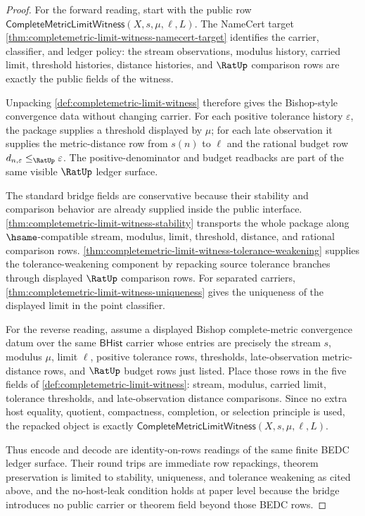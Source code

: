 \begin{proof}
For the forward reading, start with the public row
$\mathsf{CompleteMetricLimitWitness}(X,s,\mu,\ell,L)$. The NameCert target
\autoref{thm:completemetric-limit-witness-namecert-target} identifies the
carrier, classifier, and ledger policy: the stream observations, modulus
history, carried limit, threshold histories, distance histories, and $\RatUp$
comparison rows are exactly the public fields of the witness.

Unpacking \autoref{def:completemetric-limit-witness} therefore gives the
Bishop-style convergence data without changing carrier. For each positive
tolerance history $\varepsilon$, the package supplies a threshold displayed by
$\mu$; for each late observation it supplies the metric-distance row from
$s(n)$ to $\ell$ and the rational budget row
$d_{n,\varepsilon}\le_{\RatUp}\varepsilon$. The positive-denominator and budget
readbacks are part of the same visible $\RatUp$ ledger surface.

The standard bridge fields are conservative because their stability and
comparison behavior are already supplied inside the public interface.
\autoref{thm:completemetric-limit-witness-stability} transports the whole
package along $\hsame$-compatible stream, modulus, limit, threshold, distance,
and rational comparison rows.
\autoref{thm:completemetric-limit-witness-tolerance-weakening} supplies the
tolerance-weakening component by repacking source tolerance branches through
displayed $\RatUp$ comparison rows. For separated carriers,
\autoref{thm:completemetric-limit-witness-uniqueness} gives the uniqueness of
the displayed limit in the point classifier.

For the reverse reading, assume a displayed Bishop complete-metric convergence
datum over the same $\mathsf{BHist}$ carrier whose entries are precisely the
stream $s$, modulus $\mu$, limit $\ell$, positive tolerance rows, thresholds,
late-observation metric-distance rows, and $\RatUp$ budget rows just listed.
Place those rows in the five fields of
\autoref{def:completemetric-limit-witness}: stream, modulus, carried limit,
tolerance thresholds, and late-observation distance comparisons. Since no
extra host equality, quotient, compactness, completion, or selection principle
is used, the repacked object is exactly
$\mathsf{CompleteMetricLimitWitness}(X,s,\mu,\ell,L)$.

Thus encode and decode are identity-on-rows readings of the same finite BEDC
ledger surface. Their round trips are immediate row repackings, theorem
preservation is limited to stability, uniqueness, and tolerance weakening as
cited above, and the no-host-leak condition holds at paper level because the
bridge introduces no public carrier or theorem field beyond those BEDC rows.
\end{proof}

